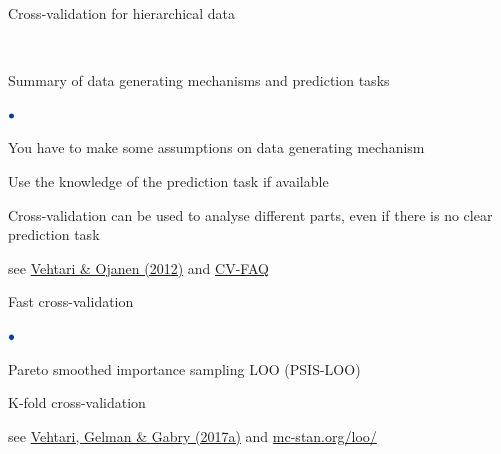 \documentclass[english,t]{beamer}
\newenvironment{list1}{
   \begin{list}{$\color{list1}\bullet$}{\itemsep=6pt}}{
  \end{list}}
\begin{document}
\begin{frame}{Cross-validation for hierarchical data}

  \\
  
\end{frame}

\begin{frame}{}

{\Large\color{navyblue} Summary of data generating mechanisms and prediction tasks}

\begin{list1}
\item You have to make some assumptions on data generating mechanism
\item Use the knowledge of the prediction task if available
\item Cross-validation can be used to analyse different parts, even if
  there is no clear prediction task
\end{list1}

 \vspace{7.5\baselineskip}
{ \small see \href{http://dx.doi.org/10.1214/12-SS102}{Vehtari \& Ojanen (2012)} and \href{https://avehtari.github.io/modelselection/CV-FAQ.html}{CV-FAQ}}

\end{frame}

\begin{frame}{Fast cross-validation}

\begin{list1}
\item Pareto smoothed importance sampling LOO (PSIS-LOO)
\item K-fold cross-validation
\end{list1}

\vspace{12\baselineskip}

{\small see \href{http://link.springer.com/article/10.1007/s11222-016-9696-4}{Vehtari, Gelman \& Gabry (2017a)} and \url{mc-stan.org/loo/}}

\end{frame}
\end{document}
